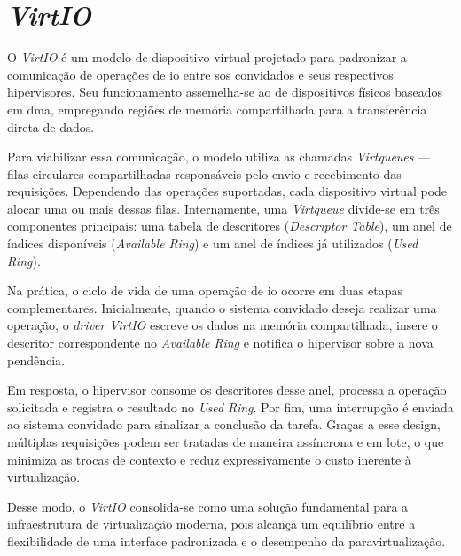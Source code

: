\section{\textit{VirtIO}}

O \textit{VirtIO} \cite{RustyRussellVirtIO} é um modelo de dispositivo virtual projetado para padronizar a comunicação de operações de \gls{io} entre \glspl{so} convidados e seus respectivos hipervisores.
Seu funcionamento assemelha-se ao de dispositivos físicos baseados em \gls{dma}, empregando regiões de memória compartilhada para a transferência direta de dados.

Para viabilizar essa comunicação, o modelo utiliza as chamadas \textit{Virtqueues} — filas circulares compartilhadas responsáveis pelo envio e recebimento das requisições. Dependendo das operações suportadas,
cada dispositivo virtual pode alocar uma ou mais dessas filas. Internamente, uma \textit{Virtqueue} divide-se em três componentes principais: uma tabela de descritores (\textit{Descriptor Table}), um anel de
índices disponíveis (\textit{Available Ring}) e um anel de índices já utilizados (\textit{Used Ring}).

Na prática, o ciclo de vida de uma operação de \gls{io} ocorre em duas etapas complementares. Inicialmente, quando o sistema convidado deseja realizar uma operação, o \textit{driver VirtIO} escreve os dados
na memória compartilhada, insere o descritor correspondente no \textit{Available Ring} e notifica o hipervisor sobre a nova pendência. 

Em resposta, o hipervisor consome os descritores desse anel, processa a operação solicitada e registra o resultado no \textit{Used Ring}. Por fim, uma interrupção é enviada ao sistema convidado para sinalizar a
conclusão da tarefa. Graças a esse design, múltiplas requisições podem ser tratadas de maneira assíncrona e em lote, o que minimiza as trocas de contexto e reduz expressivamente o custo inerente à virtualização.

Desse modo, o \textit{VirtIO} consolida-se como uma solução fundamental para a infraestrutura de virtualização moderna, pois alcança um equilíbrio entre a flexibilidade de uma interface padronizada e o
desempenho da paravirtualização.
